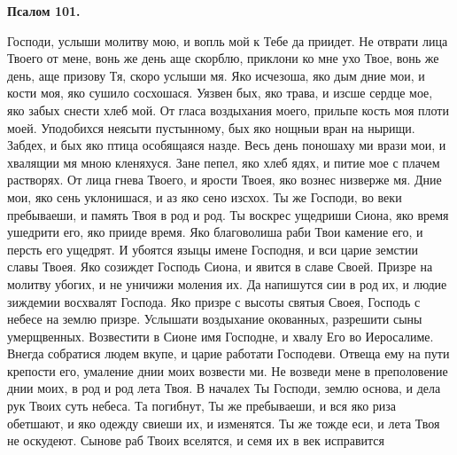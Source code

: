 \medskip


\bfseries Псалом 101.\normalfont{}


Господи, услыши молитву мою, и вопль мой к Тебе да приидет. Не отврати лица Твоего от мене, вонь же день аще скорблю, приклони ко мне ухо Твое, вонь же день, аще призову Тя, скоро услыши мя. Яко исчезоша, яко дым дние мои, и кости моя, яко сушило сосхошася. Уязвен бых, яко трава, и изсше сердце мое, яко забых снести хлеб мой. От гласа воздыхания моего, прильпе кость моя плоти моей. Уподобихся неясыти пустынному, бых яко нощныи вран на нырищи. Забдех, и бых яко птица особящаяся назде. Весь день поношаху ми врази мои, и хвалящии мя мною кленяхуся. Зане пепел, яко хлеб ядях, и питие мое с плачем растворях. От лица гнева Твоего, и ярости Твоея, яко вознес низверже мя. Дние мои, яко сень уклонишася, и аз яко сено изсхох. Ты же Господи, во веки пребываеши, и память Твоя в род и род. Ты воскрес ущедриши Сиона, яко время ушедрити его, яко прииде время. Яко благоволиша раби Твои камение его, и персть его ущедрят. И убоятся языцы имене Господня, и вси царие земстии славы Твоея. Яко созиждет Господь Сиона, и явится в славе Своей. Призре на молитву убогих, и не уничижи моления их. Да напишутся сии в род их, и людие зиждемии восхвалят Господа. Яко призре с высоты святыя Своея, Господь с небесе на землю призре. Услышати воздыхание окованных, разрешити сыны умерщвенных. Возвестити в Сионе имя Господне, и хвалу Его во Иеросалиме. Внегда собратися людем вкупе, и царие работати Господеви. Отвеща ему на пути крепости его, умаление днии моих возвести ми. Не возведи мене в преполовение днии моих, в род и род лета Твоя. В началех Ты Господи, землю основа, и дела рук Твоих суть небеса. Та погибнут, Ты же пребываеши, и вся яко риза обетшают, и яко одежду свиеши их, и изменятся. Ты же тожде еси, и лета Твоя не оскудеют. Сынове раб Твоих вселятся, и семя их в век исправится



